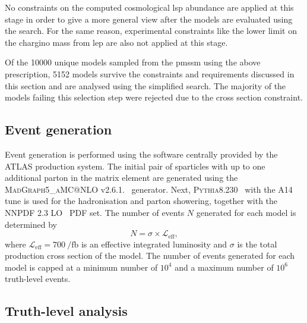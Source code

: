 No constraints on the computed cosmological \gls{lsp} abundance are applied at this stage in order to give a more general view after the models are evaluated using the \onelepton search. For the same reason, experimental constraints like the lower limit on the chargino mass from \gls{lep} are also not applied at this stage. 

Of the \num[group-separator={,}]{10000} unique models sampled from the \gls{pmssm} using the above prescription, \num[group-separator={,}]{5152} models survive the constraints and requirements discussed in this section and are analysed using the simplified \onelepton search. The majority of the models failing this selection step were rejected due to the cross section constraint.

\subsection{Event generation}

Event generation is performed using the software centrally provided by the ATLAS production system. The initial pair of sparticles with up to one additional parton in the matrix element are generated using the \textsc{MadGraph5\_aMC@NLO} v2.6.1.~\cite{MGaMCNLO:2014hca,Frederix:2012ps} generator. Next, \textsc{Pythia8.230}~\cite{Pythia8:2007gs}  with the \textsc{A14}~\cite{ATL-PHYS-PUB-2014-021} tune is used for the hadronisation and parton showering, together with the NNPDF 2.3 LO~\cite{Ball:2012cx} \gls{PDF} set. The number of events $N$ generated for each model is determined by
\begin{equation}
	N = \sigma \times \mathcal{L}_\mathrm{eff},
\end{equation}
where $\mathcal{L}_\mathrm{eff} = \SI{700}{\per\femto\barn}$ is an effective integrated luminosity and $\sigma$ is the total production cross section of the model. The number of events generated for each model is capped at a minimum number of $10^4$ and a maximum number of $10^6$ truth-level events.

\subsection{Truth-level analysis}

